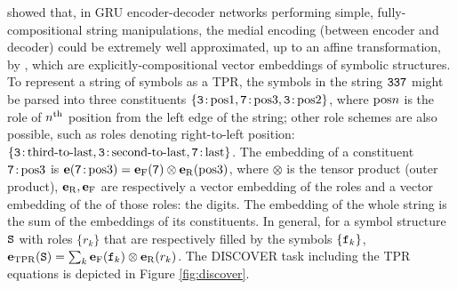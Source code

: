 \citeauthor{mccoy} showed that, in GRU \citep{cho-etal-2014-learning} encoder-decoder networks performing simple, fully-compositional string manipulations, the medial encoding (between encoder and decoder) could be extremely well approximated, up to an affine transformation, by  \citep{Smolensky:1990:TPV:102418.102425}, which are explicitly-compositional vector embeddings of symbolic structures. To represent a string of symbols as a TPR, the symbols in the string ${\mathtt{337}}$ might be parsed into three constituents $\{ {\mathtt{3}}\colon\!{\mathrm{pos}}1, {\mathtt{7}}\colon\!{\mathrm{pos}}3, {\mathtt{3}}\colon\!{\mathrm{pos}}2 \}$, where ${\mathrm{pos}}n$ is the role of $n^{{\mathrm{th}}}$ position from the left edge of the string; other role schemes are also possible, such as roles denoting right-to-left position: $\{ {\mathtt{3}}\colon\!{\mathrm{third\mbox{-}to\mbox{-}last}}, {\mathtt{3}}\colon\!{\mathrm{second\mbox{-}to\mbox{-}last}}, {\mathtt{7}}\colon\!{\mathrm{last}} \}$. The embedding of a constituent ${\mathtt{7}}\colon\!{\mathrm{pos}}3$ is ${\mathbf{e}}({\mathtt{7}}\colon\!{\mathrm{pos}}3) = {\mathbf{e}}_{\mathrm{F}}({\mathtt{7}}) \otimes {\mathbf{e}}_{\mathrm{R}}({\mathrm{pos3}})$, where $\otimes$ is the tensor product (outer product), ${\mathbf{e}}_{\mathrm{R}}, {\mathbf{e}}_{\mathrm{F}}$ are respectively a vector embedding of the roles and a vector embedding of the  of those roles: the digits. The embedding of the whole string is the sum of the embeddings of its constituents. 
In general, for a symbol structure ${\mathtt{S}}$ with roles $\{ r_k \}$ that are respectively filled by the symbols $\{ {\mathtt{f}}_k \}$,
${\mathbf{e}}_{\mathrm{TPR}}({\mathtt{S}}) = \sum_k {\mathbf{e}}_{\mathrm{F}}({\mathtt{f}}_k) \otimes {\mathbf{e}}_{\mathrm{R}}(r_k)$. The DISCOVER task including the TPR equations is depicted in Figure \ref{fig:discover}.

